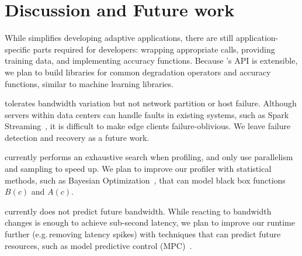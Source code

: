 \section{Discussion and Future work}
\label{sec:discussion}

 While \sysname{} simplifies developing
adaptive applications, there are still application-specific parts required for
developers: wrapping appropriate \maybe{} calls, providing training data, and
implementing accuracy functions. Because \sysname{}'s API is extensible, we plan
to build libraries for common degradation operators and accuracy functions,
similar to machine learning libraries.

 \sysname{} tolerates bandwidth variation
but not network partition or host failure. Although servers within data centers
can handle faults in existing systems, such as Spark
Streaming~\cite{zaharia2013discretized}, it is difficult to make edge clients
failure-oblivious.  We leave failure detection and recovery as a future work.

 \sysname{} currently performs an exhaustive search when
profiling, and only use parallelism and sampling to speed up. We plan to improve
our profiler with statistical methods, such as Bayesian
Optimization~\cite{snoek2012practical, alipourfard2017cherrypick}, that can
model black box functions $B(c)$ and $A(c)$.



 \sysname{} currently does not predict
future bandwidth. While reacting to bandwidth changes is enough to achieve
sub-second latency, we plan to improve our runtime further (e.g.\,removing
latency spikes) with techniques that can predict future resources, such as model
predictive control (MPC)~\cite{camacho2013model, yin2015control}.


